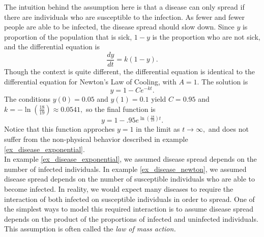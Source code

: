 {The intuition behind the assumption here is that a disease can only spread if there are individuals who are susceptible to the infection.  As fewer and fewer people are able to be infected, the disease spread should slow down.  Since $y$ is proportion of the population that is sick, $1-y$ is the proportion who are not sick, and the differential equation is
	\[
		\frac{dy}{dt} = k(1-y).
	\]
Though the context is quite different, the differential equation is identical to the differential equation for Newton's Law of Cooling, with $A=1$.  The solution is
	\[
		y = 1 - Ce^{-kt}.
	\]
The conditions $y(0)=0.05$ and $y(1) = 0.1$ yield $C = 0.95$ and $k = -\ln\left(\frac{18}{19}\right) \approx 0.0541,$ so the final function is
	\[
		y = 1-.95e^{\ln\left(\frac{18}{19}\right)t}.
	\]
Notice that this function approches $y=1$ in the limit as $t \to \infty,$ and does not suffer from the non-physical behavior described in example \ref{ex_disease_exponential}.
}\\

In example \ref{ex_disease_exponential}, we assumed disease spread depends on the number of infected individuals.  In example \ref{ex_disease_newton}, we assumed disease spread depends on the number of susceptible individuals who are able to become infected.  In reality, we would expect many diseases to require the interaction of both infected on susceptible individuals in order to spread.  One of the simplest ways to model this required interaction is to assume disease spread depends on the product of the proportions of infected and uninfected individuals.  This assumption is often called the \emph{law of mass action.}\\


